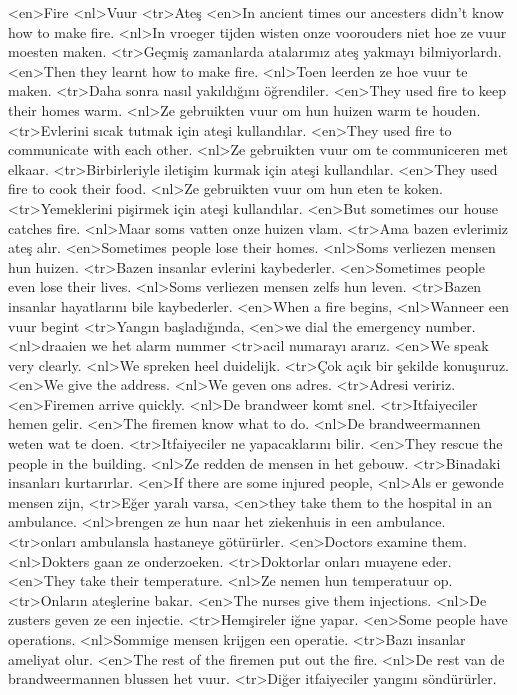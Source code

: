 <en>Fire 
<nl>Vuur 
<tr>Ateş 
<en>In ancient times our ancesters didn’t know how to make fire.
<nl>In vroeger tijden wisten onze voorouders niet hoe ze vuur moesten maken.
<tr>Geçmiş zamanlarda atalarımız ateş yakmayı bilmiyorlardı.
<en>Then they learnt how to make fire.
<nl>Toen leerden ze hoe vuur te maken.
<tr>Daha sonra nasıl yakıldığını öğrendiler.
<en>They used fire to keep their homes warm.
<nl>Ze gebruikten vuur om hun huizen warm te houden.
<tr>Evlerini sıcak tutmak için ateşi kullandılar.
<en>They used fire to communicate with each other.
<nl>Ze gebruikten vuur om te communiceren met elkaar.
<tr>Birbirleriyle iletişim kurmak için ateşi kullandılar.
<en>They used fire to cook their food.
<nl>Ze gebruikten vuur om hun eten te koken.
<tr>Yemeklerini pişirmek için ateşi kullandılar.
<en>But sometimes our house  catches fire.
<nl>Maar soms vatten onze huizen vlam.
<tr>Ama bazen evlerimiz ateş alır.
<en>Sometimes people lose their homes.
<nl>Soms verliezen mensen hun huizen.
<tr>Bazen insanlar evlerini kaybederler.
<en>Sometimes people even lose their lives.
<nl>Soms verliezen mensen zelfs hun leven.
<tr>Bazen insanlar hayatlarını bile kaybederler.
<en>When a fire begins,
<nl>Wanneer een vuur begint
<tr>Yangın başladığında,
<en>we dial the emergency number.
<nl>draaien we het alarm nummer
<tr>acil numarayı ararız.
<en>We speak very clearly.
<nl>We spreken heel duidelijk.
<tr>Çok açık bir şekilde konuşuruz.
<en>We give the address.
<nl>We geven ons adres.
<tr>Adresi veririz.
<en>Firemen  arrive quickly.
<nl>De brandweer komt snel. 
<tr>Itfaiyeciler hemen gelir.
<en>The firemen know what to do.
<nl>De brandweermannen weten wat te doen.
<tr>Itfaiyeciler ne yapacaklarını bilir.
<en>They rescue the  people in the building.
<nl>Ze redden de mensen in het gebouw.
<tr>Binadaki insanları kurtarırlar.
<en>If there are some injured people,
<nl>Als er gewonde mensen zijn,
<tr>Eğer yaralı varsa,
<en>they take them to the hospital in an ambulance.
<nl>brengen ze hun naar het ziekenhuis in een ambulance.
<tr>onları ambulansla hastaneye götürürler.
<en>Doctors examine them.
<nl>Dokters gaan ze onderzoeken.
<tr>Doktorlar onları muayene eder.
<en>They take their temperature.
<nl>Ze nemen hun temperatuur op.
<tr>Onların ateşlerine bakar.
<en>The nurses give them injections.
<nl>De zusters geven ze een injectie.
<tr>Hemşireler iğne yapar.
<en>Some people have operations.
<nl>Sommige mensen krijgen een operatie.
<tr>Bazı insanlar ameliyat olur.
<en>The rest of the firemen put out the fire.
<nl>De rest van de brandweermannen blussen het vuur.
<tr>Diğer itfaiyeciler yangını söndürürler.
